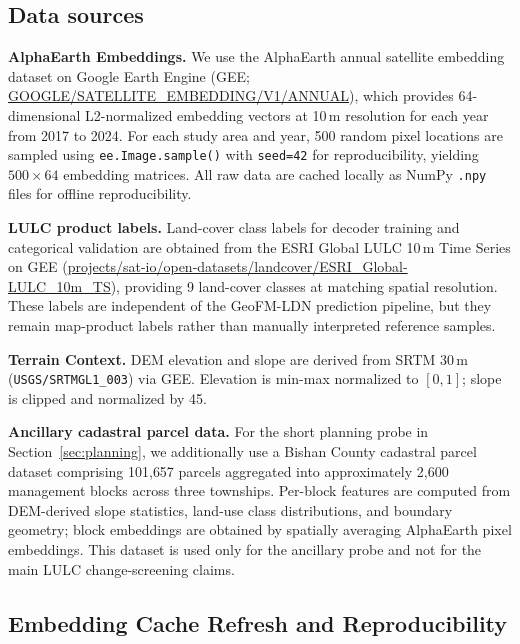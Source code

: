 \documentclass{article}
\begin{document}
\subsection{Data sources}

\textbf{AlphaEarth Embeddings.} We use the AlphaEarth annual satellite embedding dataset on Google Earth Engine (GEE; \url{GOOGLE/SATELLITE_EMBEDDING/V1/ANNUAL}), which provides 64-dimensional L2-normalized embedding vectors at 10\,m resolution for each year from 2017 to 2024. For each study area and year, 500 random pixel locations are sampled using \texttt{ee.Image.sample()} with \texttt{seed=42} for reproducibility, yielding $500\times64$ embedding matrices. All raw data are cached locally as NumPy \texttt{.npy} files for offline reproducibility.

\textbf{LULC product labels.} Land-cover class labels for decoder training and categorical validation are obtained from the ESRI Global LULC 10\,m Time Series on GEE (\url{projects/sat-io/open-datasets/landcover/ESRI_Global-LULC_10m_TS}), providing 9 land-cover classes at matching spatial resolution. These labels are independent of the GeoFM-LDN prediction pipeline, but they remain map-product labels rather than manually interpreted reference samples.

\textbf{Terrain Context.} DEM elevation and slope are derived from SRTM 30\,m (\texttt{USGS/SRTMGL1\_003}) via GEE. Elevation is min-max normalized to $[0,1]$; slope is clipped and normalized by 45\textdegree.

\textbf{Ancillary cadastral parcel data.} For the short planning probe in Section~\ref{sec:planning}, we additionally use a Bishan County cadastral parcel dataset comprising 101{,}657 parcels aggregated into approximately 2{,}600 management blocks across three townships. Per-block features are computed from DEM-derived slope statistics, land-use class distributions, and boundary geometry; block embeddings are obtained by spatially averaging AlphaEarth pixel embeddings. This dataset is used only for the ancillary probe and not for the main LULC change-screening claims.

\subsection{Embedding Cache Refresh and Reproducibility}
\label{sec:data_refresh}

\noindent{}
\end{document}
